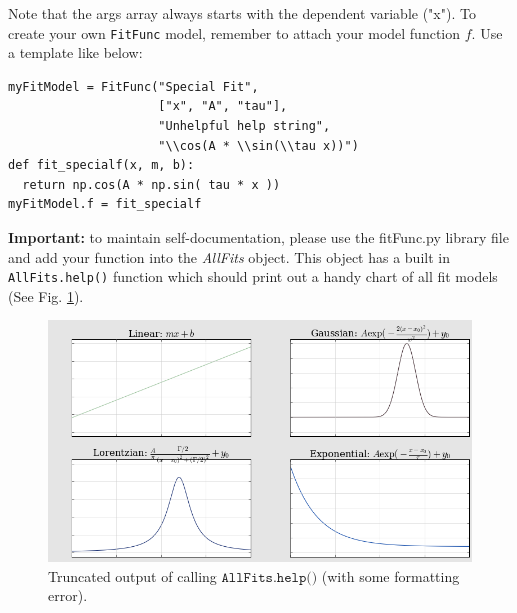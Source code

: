 \documentclass[10pt]{report}
\begin{document}
Note that the args array always starts with the dependent variable ("x"). To create your own \texttt{FitFunc} model, remember to attach your model function $f$. Use a template like below:
\begin{lstlisting}[caption=Wave properties]
myFitModel = FitFunc("Special Fit",
                     ["x", "A", "tau"],
                     "Unhelpful help string",
                     "\\cos(A * \\sin(\\tau x))")
def fit_specialf(x, m, b):
  return np.cos(A * np.sin( tau * x ))
myFitModel.f = fit_specialf
\end{lstlisting}


\textbf{Important:} to maintain self-documentation, please use the fitFunc.py library file and add your function into the \textit{AllFits} object. This object has a built in \texttt{AllFits.help()} function which should print out a handy chart of all fit models (See Fig. \ref{fig:allfits}).

\begin{figure}[hb]
\vspace{1cm}
\centering
\includegraphics[width=.75\textwidth]{images/truncAllFitsHelp.png}
\caption{Truncated output of calling $\texttt{AllFits.help()}$ (with some formatting error).}
\label{fig:allfits}
\end{figure}




\clearpage
\end{document}
